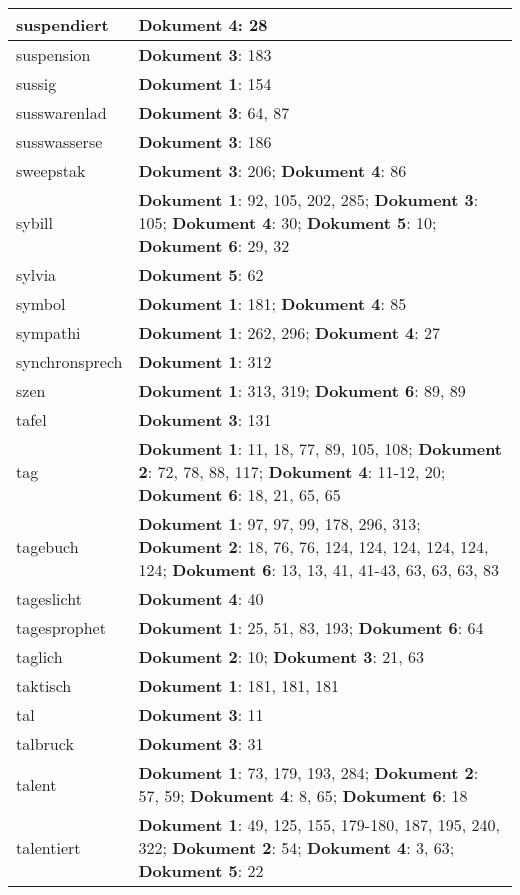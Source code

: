 \documentclass[a5paper]{article}
\begin{document}
\begin{longtable}[l]{|l|p{3in}|}
\hline
suspendiert & \textbf{Dokument 4}: 28 \\
\hline
suspension & \textbf{Dokument 3}: 183 \\
\hline
sussig & \textbf{Dokument 1}: 154 \\
\hline
susswarenlad & \textbf{Dokument 3}: 64, 87 \\
\hline
susswasserse & \textbf{Dokument 3}: 186 \\
\hline
sweepstak & \textbf{Dokument 3}: 206; \textbf{Dokument 4}: 86 \\
\hline
sybill & \textbf{Dokument 1}: 92, 105, 202, 285; \textbf{Dokument 3}: 105; \textbf{Dokument 4}: 30; \textbf{Dokument 5}: 10; \textbf{Dokument 6}: 29, 32 \\
\hline
sylvia & \textbf{Dokument 5}: 62 \\
\hline
symbol & \textbf{Dokument 1}: 181; \textbf{Dokument 4}: 85 \\
\hline
sympathi & \textbf{Dokument 1}: 262, 296; \textbf{Dokument 4}: 27 \\
\hline
synchronsprech & \textbf{Dokument 1}: 312 \\
\hline
szen & \textbf{Dokument 1}: 313, 319; \textbf{Dokument 6}: 89, 89 \\
\hline
tafel & \textbf{Dokument 3}: 131 \\
\hline
tag & \textbf{Dokument 1}: 11, 18, 77, 89, 105, 108; \textbf{Dokument 2}: 72, 78, 88, 117; \textbf{Dokument 4}: 11-12, 20; \textbf{Dokument 6}: 18, 21, 65, 65 \\
\hline
tagebuch & \textbf{Dokument 1}: 97, 97, 99, 178, 296, 313; \textbf{Dokument 2}: 18, 76, 76, 124, 124, 124, 124, 124, 124; \textbf{Dokument 6}: 13, 13, 41, 41-43, 63, 63, 63, 83 \\
\hline
tageslicht & \textbf{Dokument 4}: 40 \\
\hline
tagesprophet & \textbf{Dokument 1}: 25, 51, 83, 193; \textbf{Dokument 6}: 64 \\
\hline
taglich & \textbf{Dokument 2}: 10; \textbf{Dokument 3}: 21, 63 \\
\hline
taktisch & \textbf{Dokument 1}: 181, 181, 181 \\
\hline
tal & \textbf{Dokument 3}: 11 \\
\hline
talbruck & \textbf{Dokument 3}: 31 \\
\hline
talent & \textbf{Dokument 1}: 73, 179, 193, 284; \textbf{Dokument 2}: 57, 59; \textbf{Dokument 4}: 8, 65; \textbf{Dokument 6}: 18 \\
\hline
talentiert & \textbf{Dokument 1}: 49, 125, 155, 179-180, 187, 195, 240, 322; \textbf{Dokument 2}: 54; \textbf{Dokument 4}: 3, 63; \textbf{Dokument 5}: 22 \\

\end{longtable}
\end{document}
